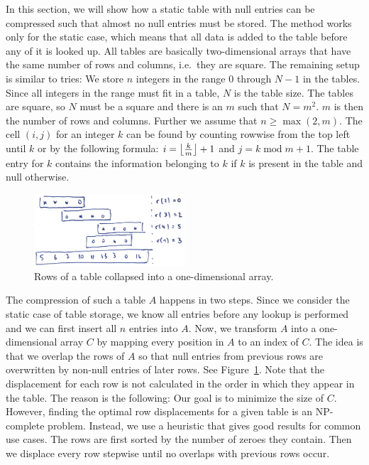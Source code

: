 In this section, we will show how a static table with null entries can be compressed such that almost no null entries must be stored.
The method works only for the static case, which means that all data is added to the table before any of it is looked up.
All tables are basically two-dimensional arrays that have the same number of rows and columns, i.e.\ they are square.
The remaining setup is similar to tries:
We store $n$ integers in the range $0$ through $N - 1$ in the tables.
Since all integers in the range must fit in a table, $N$ is the table size.
The tables are square, so $N$ must be a square and there is an $m$ such that $N = m^2$.
$m$ is then the number of rows and columns.
Further we assume that $n \geq \max(2, m)$.
The cell $(i, j)$ for an integer $k$ can be found by counting rowwise from the top left until $k$ or by the following formula: $i = \left\lfloor \frac{k}{m} \right\rfloor + 1$ and $j = k \operatorname{mod} m + 1$.
The table entry for $k$ contains the information belonging to $k$ if $k$ is present in the table and null otherwise.

\begin{figure}
  \includegraphics[width=0.5\textwidth]{topic/collapse}
	\caption{Rows of a table collapsed into a one-dimensional array. \label{fig:row_disp}}
\end{figure}

The compression of such a table $A$ happens in two steps.
Since we consider the static case of table storage, we know all entries before any lookup is performed and we can first insert all $n$ entries into $A$.
Now, we transform $A$ into a one-dimensional array $C$ by mapping every position in $A$ to an index of $C$.
The idea is that we overlap the rows of $A$ so that null entries from previous rows are overwritten by non-null entries of later rows. See Figure~\ref{fig:row_disp}.
Note that the displacement for each row is not calculated in the order in which they appear in the table.
The reason is the following:
Our goal is to minimize the size of $C$.
However, finding the optimal row displacements for a given table is an NP-complete problem.
Instead, we use a heuristic that gives good results for common use cases.
The rows are first sorted by the number of zeroes they contain.
Then we displace every row stepwise until no overlaps with previous rows occur.